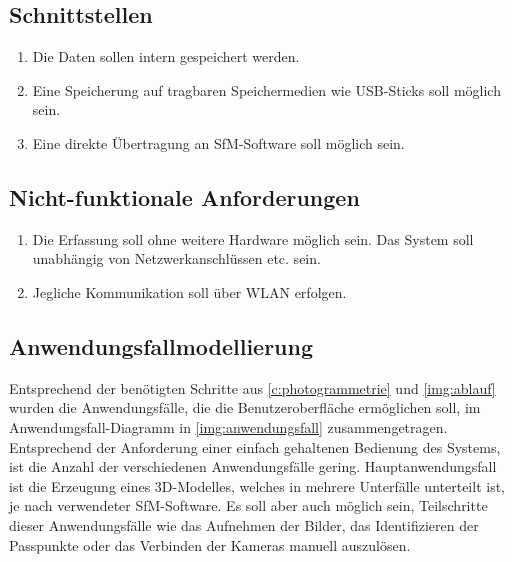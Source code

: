 \documentclass[./00PhotoBox.tex]{subfiles}
\begin{document}
\subsection{Schnittstellen}
\begin{enumerate}[label=S\arabic*]
    \item \label{e:intspeicher} Die Daten sollen intern gespeichert werden.
    \item \label{e:usbspeicher} Eine Speicherung auf tragbaren Speichermedien wie USB-Sticks soll möglich sein.
    \item \label{e:sfmsoftware} Eine direkte Übertragung an \Gls{SfM}-Software soll möglich sein.
\end{enumerate}

\subsection{Nicht-funktionale Anforderungen}
\begin{enumerate}[label=N\arabic*]
    \item \label{e:standalone} Die Erfassung soll ohne weitere Hardware möglich sein. Das System soll unabhängig von Netzwerkanschlüssen etc. sein.
    \item \label{e:wlan} Jegliche Kommunikation soll über WLAN erfolgen.
\end{enumerate}

\subsection{Anwendungsfallmodellierung}
\label{sec:Anwendungsfallmodellierung}

Entsprechend der benötigten Schritte aus \autoref{c:photogrammetrie} und \autoref{img:ablauf} wurden die Anwendungsfälle, die die Benutzeroberfläche ermöglichen soll, im Anwendungsfall-Dia\-gramm in \autoref{img:anwendungsfall} zusammengetragen. Entsprechend der Anforderung einer einfach gehaltenen Bedienung des Systems, ist die Anzahl der verschiedenen Anwendungsfälle gering. Hauptanwendungsfall ist die Erzeugung eines 3D-Modelles, welches in mehrere Unterfälle unterteilt ist, je nach verwendeter \Gls{SfM}-Software. Es soll aber auch möglich sein, Teilschritte dieser Anwendungsfälle wie das Aufnehmen der Bilder, das Identifizieren der Passpunkte oder das Verbinden der Kameras manuell auszulösen.
\end{document}

